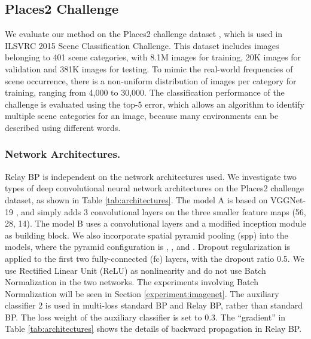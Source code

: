 \documentclass[runningheads]{llncs}
\begin{document}
\subsection{Places2 Challenge}
We evaluate our method on the Places2 challenge dataset \cite{zhou_2015}, which is used in ILSVRC 2015 Scene Classification Challenge. This dataset includes images belonging to 401 scene categories, with 8.1M images for training, 20K images for validation and 381K images for testing. To mimic the real-world frequencies of scene occurrence, there is a non-uniform distribution of images per category for training, ranging from 4,000 to 30,000. The classification performance of the challenge is evaluated using the top-5 error, which allows an algorithm to identify multiple scene categories for an image, because many environments can be described using different words.

\subsubsection{Network Architectures.} Relay BP is independent on the network architectures used. We investigate two types of deep convolutional neural network architectures on the Places2 challenge dataset, as shown in Table \ref{tab:architectures}.
The model A is based on VGGNet-19 \cite{simonyan_iclr2015}, and simply adds 3 convolutional layers on the three smaller feature maps (56, 28, 14).
The model B uses a  convolutional layers and a modified inception module as building block.
We also incorporate spatial pyramid pooling (spp) \cite{he_eccv2014} into the models, where the pyramid configuration is , ,  and . Dropout regularization is applied to the first two fully-connected (fc) layers, with the dropout ratio 0.5.
We use Rectified Linear Unit (ReLU) as nonlinearity and do not use Batch Normalization \cite{ioffe_2015} in the two networks.
The experiments involving Batch Normalization will be seen in Section \ref{experiment:imagenet}.
The auxiliary classifier \normalsize\textcircled{\scriptsize{2}} is used in multi-loss standard BP and Relay BP, rather than standard BP.
The loss weight of the auxiliary classifier is set to 0.3.
The ``gradient'' in Table \ref{tab:architectures} shows the details of backward propagation in Relay BP.
\end{document}
